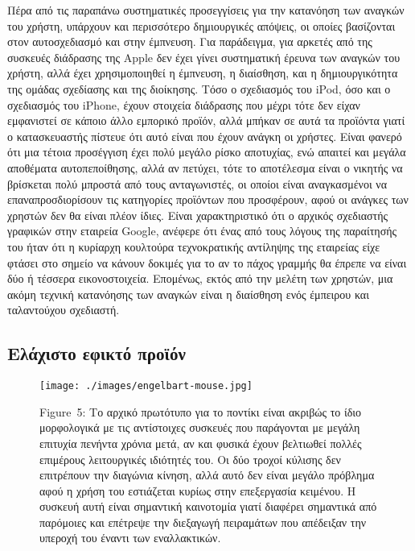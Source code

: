 \documentclass[
]{article}
\begin{document}
Πέρα από τις παραπάνω συστηματικές προσεγγίσεις για την κατανόηση των
αναγκών του χρήστη, υπάρχουν και περισσότερο δημιουργικές απόψεις, οι
οποίες βασίζονται στον αυτοσχεδιασμό και στην έμπνευση. Για παράδειγμα,
για αρκετές από της συσκευές διάδρασης της Apple δεν έχει γίνει
συστηματική έρευνα των αναγκών του χρήστη, αλλά έχει χρησιμοποιηθεί η
έμπνευση, η διαίσθηση, και η δημιουργικότητα της ομάδας σχεδίασης και
της διοίκησης. Τόσο ο σχεδιασμός του iPod, όσο και ο σχεδιασμός του
iPhone, έχουν στοιχεία διάδρασης που μέχρι τότε δεν είχαν εμφανιστεί σε
κάποιο άλλο εμπορικό προϊόν, αλλά μπήκαν σε αυτά τα προϊόντα γιατί ο
κατασκευαστής πίστευε ότι αυτό είναι που έχουν ανάγκη οι χρήστες. Είναι
φανερό ότι μια τέτοια προσέγγιση έχει πολύ μεγάλο ρίσκο αποτυχίας, ενώ
απαιτεί και μεγάλα αποθέματα αυτοπεποίθησης, αλλά αν πετύχει, τότε το
αποτέλεσμα είναι ο νικητής να βρίσκεται πολύ μπροστά από τους
ανταγωνιστές, οι οποίοι είναι αναγκασμένοι να επαναπροσδιορίσουν τις
κατηγορίες προϊόντων που προσφέρουν, αφού οι ανάγκες των χρηστών δεν θα
είναι πλέον ίδιες. Είναι χαρακτηριστικό ότι ο αρχικός σχεδιαστής
γραφικών στην εταιρεία Google, ανέφερε ότι ένας από τους λόγους της
παραίτησής του ήταν ότι η κυρίαρχη κουλτούρα τεχνοκρατικής αντίληψης της
εταιρείας είχε φτάσει στο σημείο να κάνουν δοκιμές για το αν το πάχος
γραμμής θα έπρεπε να είναι δύο ή τέσσερα εικονοστοιχεία. Επομένως, εκτός
από την μελέτη των χρηστών, μια ακόμη τεχνική κατανόησης των αναγκών
είναι η διαίσθηση ενός έμπειρου και ταλαντούχου σχεδιαστή.

\hypertarget{ux3b5ux3bbux3acux3c7ux3b9ux3c3ux3c4ux3bf-ux3b5ux3c6ux3b9ux3baux3c4ux3cc-ux3c0ux3c1ux3bfux3caux3ccux3bd}{%
\subsection{Ελάχιστο εφικτό
προϊόν}\label{ux3b5ux3bbux3acux3c7ux3b9ux3c3ux3c4ux3bf-ux3b5ux3c6ux3b9ux3baux3c4ux3cc-ux3c0ux3c1ux3bfux3caux3ccux3bd}}

\leavevmode{}%
\begin{figure}
\hypertarget{fig:engelbart-mouse}{%
\centering
\texttt{[image: ./images/engelbart-mouse.jpg]}
\caption{Figure~5: Το αρχικό πρωτότυπο για το ποντίκι είναι ακριβώς το
ίδιο μορφολογικά με τις αντίστοιχες συσκευές που παράγονται με μεγάλη
επιτυχία πενήντα χρόνια μετά, αν και φυσικά έχουν βελτιωθεί πολλές
επιμέρους λειτουργικές ιδιότητές του. Οι δύο τροχοί κύλισης δεν
επιτρέπουν την διαγώνια κίνηση, αλλά αυτό δεν είναι μεγάλο πρόβλημα αφού
η χρήση του εστιάζεται κυρίως στην επεξεργασία κειμένου. Η συσκευή αυτή
είναι σημαντική καινοτομία γιατί διαφέρει σημαντικά από παρόμοιες και
επέτρεψε την διεξαγωγή πειραμάτων που απέδειξαν την υπεροχή του έναντι
των εναλλακτικών.}\label{fig:engelbart-mouse}
}
\end{figure}
\end{document}
